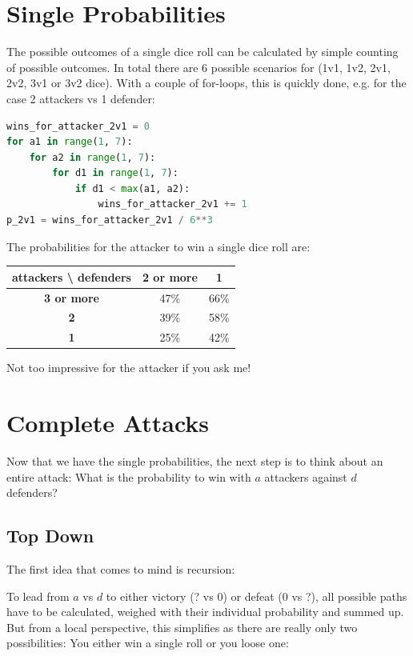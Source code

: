 \documentclass[11pt,a4paper]{article}
\begin{document}
\section{Single Probabilities}
The possible outcomes of a single dice roll can be calculated by simple counting of possible outcomes. In total there are 6 possible scenarios for (1v1, 1v2, 2v1, 2v2, 3v1 or 3v2 dice). With a couple of for-loops, this is quickly done, e.g. for the case 2 attackers vs 1 defender:

\begin{lstlisting}[language=Python]
wins_for_attacker_2v1 = 0
for a1 in range(1, 7):
    for a2 in range(1, 7):
        for d1 in range(1, 7):
            if d1 < max(a1, a2):
                wins_for_attacker_2v1 += 1
p_2v1 = wins_for_attacker_2v1 / 6**3
\end{lstlisting}

The probabilities for the attacker to win a single dice roll are:

\begin{table}[H]
\centering
\begin{tabular}{|c|c|c|}
\hline
\textbf{attackers \textbackslash\; defenders} & \textbf{2 or more} & \textbf{1} \\
\hline
\textbf{3 or more} & 47\% & 66\% \\
\hline
\textbf{2} & 39\% & 58\% \\
\hline
\textbf{1} & 25\% & 42\% \\
\hline
\end{tabular}
\end{table}

Not too impressive for the attacker if you ask me!

\section{Complete Attacks}
Now that we have the single probabilities, the next step is to think about an entire attack: What is the probability to win with $a$ attackers against $d$ defenders?

\subsection{Top Down}
The first idea that comes to mind is recursion:

To lead from $a$ vs $d$ to either victory (? vs 0) or defeat (0 vs ?), all possible paths have to be calculated, weighed with their individual probability and summed up. But from a local perspective, this simplifies as there are really only two possibilities: You either win a single roll or you loose one:
\end{document}
